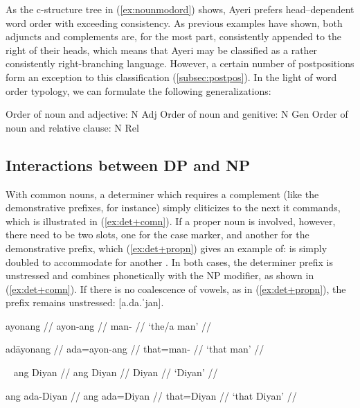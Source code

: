 As the c-structure tree in (\ref{ex:nounmodord}) shows, Ayeri prefers 
head--dependent word order with exceeding consistency. As previous examples have
shown, both adjuncts and complements are, for the most part, consistently 
appended to the right of their heads, which means that Ayeri may be classified
as a rather consistently right-branching language. However, a certain number of
postpositions form an exception to this classification 
(\autoref{subsec:postpos}). In the light of word order typology, we can 
formulate the following generalizations:

\pex
\a Order of noun and adjective: N Adj
\a Order of noun and genitive: N Gen
\a Order of noun and relative clause: N Rel
\xe

\subsection{Interactions between DP and NP}
\label{subsec:dpnpinteract}

With common nouns, a determiner which requires a complement (like the
demonstrative prefixes, for instance) simply cliticizes to the next 
it commands, which is illustrated in (\ref{ex:det+comn}). If a proper noun is
involved, however, there need to be two  slots, one for the case
marker, and another for the demonstrative prefix, which (\ref{ex:det+propn})
gives an example of:  is simply doubled to accommodate for another
. In both cases, the determiner prefix is unstressed and combines 
phonetically with the NP modifier, as shown in (\ref{ex:det+comn}). If there is
no coalescence of vowels, as in (\ref{ex:det+propn}), the prefix remains
unstressed:  [a.da.ˈjan].

\begin{multicols}{2}
\pex\label{ex:det+comn}
\a\begingl
	\gla ayonang //
	\glb ayon-ang //
	\glc man-\Aarg{} //
	\glft `the/a man' //
\endgl

\a\begingl
	\gla adāyonang //
	\glb ada=ayon-ang //
	\glc that=man-\Aarg{} //
	\glft `that man' //
\endgl

\xe

\pex~\label{ex:det+propn}
\a\begingl
	\gla ang Diyan //
	\glb ang Diyan //
	\glc \Aarg{} Diyan //
	\glft `Diyan' //
\endgl

\a\label{ex:case+det+propn}\begingl
	\gla ang ada-Diyan //
	\glb ang ada=Diyan //
	\glc \Aarg{} that=Diyan //
	\glft `that Diyan' //
\endgl

\xe

\end{multicols}

